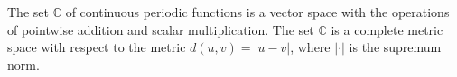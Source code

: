 The set $\mathbb{C}$ of continuous periodic functions is a vector space with the operations of pointwise addition and scalar multiplication. The set $\mathbb{C}$ is a complete metric space with respect to the metric $d(u, v) = |u - v|$, where $|\cdot|$ is the supremum norm.
